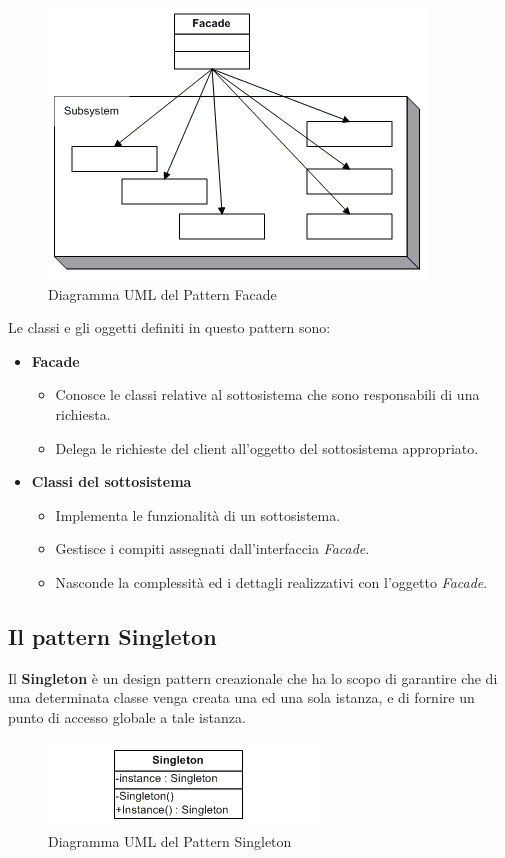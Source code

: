 \documentclass[11pt]{article}
\begin{document}
\begin{figure}[H]
	\centering
	\includegraphics[scale=0.70]{images/facade.jpg}
	\caption{Diagramma UML del Pattern Facade}
	\label{facade}
\end{figure}

Le classi e gli oggetti definiti in questo pattern sono:
\begin{itemize}
\item \textbf{Facade}
\begin{itemize}
	\item Conosce le classi relative al sottosistema che sono responsabili di una richiesta.
	\item Delega le richieste del client all'oggetto del sottosistema appropriato.
\end{itemize}
\item \textbf{Classi del sottosistema}
\begin{itemize}
	\item Implementa le funzionalità di un sottosistema.
	\item Gestisce i compiti assegnati dall'interfaccia \textit{Facade}.
	\item Nasconde la complessità ed i dettagli realizzativi con l'oggetto \textit{Facade}.
\end{itemize}
\end{itemize}

\subsection{Il pattern Singleton}
Il \textbf{Singleton} è un design pattern creazionale che ha lo scopo di garantire che di una determinata classe venga creata una ed una sola istanza, e di fornire un punto di accesso globale a tale istanza.

\begin{figure}[H]
	\centering
	\includegraphics[scale=0.90]{images/singleton.jpg}
	\caption{Diagramma UML del Pattern Singleton}
	\label{singleton}
\end{figure}
\end{document}
